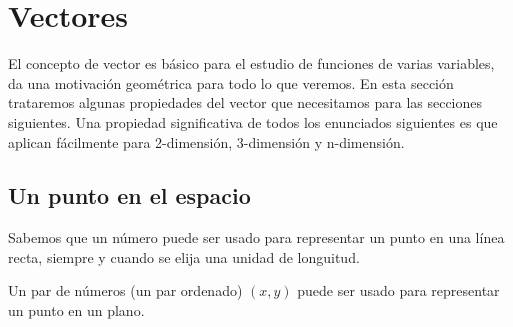 \chapter{Vectores}\label{ch:vectores}

El concepto de vector es básico para el estudio de funciones de varias variables, da una motivación
geométrica para todo lo que veremos. En esta sección trataremos algunas propiedades del vector
que necesitamos para las secciones siguientes. Una propiedad significativa de todos los enunciados 
siguientes es que aplican f\'acilmente para 2-dimensión, 3-dimensión y n-dimensión.

\section{Un punto en el espacio}

Sabemos que un número puede ser usado para representar un punto en una línea recta, siempre y cuando se
elija una unidad de longuitud.

Un par de números (un par ordenado) $(x,y)$ puede ser usado para representar un punto en un plano.

\begin{figure}[!ht]%
    \centering
    \qquad
    \label{fig:example}%
\end{figure}

